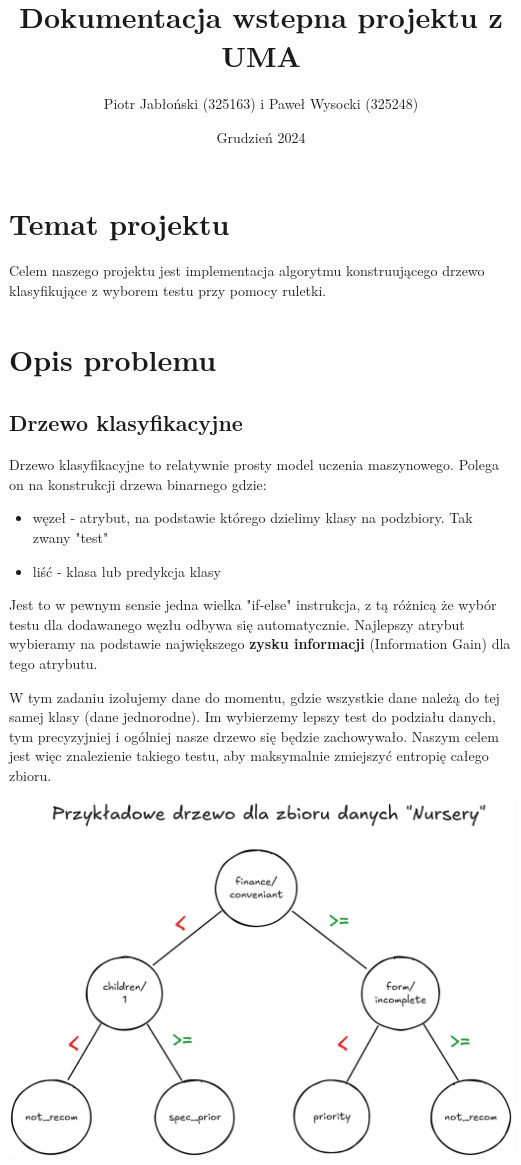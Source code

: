 \documentclass[11pt]{article}
\author{Piotr Jabłoński (325163) i Paweł Wysocki (325248)}
\date{Grudzień 2024}
\title{Dokumentacja wstepna projektu z UMA}
\begin{document}
\maketitle
\tableofcontents

\pagebreak
\section{Temat projektu}
\label{sec:org004bb5c}
Celem naszego projektu jest implementacja algorytmu konstruującego drzewo klasyfikujące z wyborem testu przy pomocy ruletki.
\section{Opis problemu}
\label{sec:org19cc40d}

\subsection{Drzewo klasyfikacyjne}
\label{sec:orgdbf1c0f}
Drzewo klasyfikacyjne to relatywnie prosty model uczenia maszynowego. Polega on na konstrukcji drzewa binarnego gdzie:
\begin{itemize}
\item węzeł - atrybut, na podstawie którego dzielimy klasy na podzbiory. Tak zwany "test"
\item liść - klasa lub predykcja klasy
\end{itemize}
Jest to w pewnym sensie jedna wielka "if-else" instrukcja, z tą różnicą że wybór testu dla dodawanego węzłu odbywa się automatycznie. Najlepszy atrybut wybieramy na podstawie największego \textbf{zysku informacji} (Information Gain) dla tego atrybutu.

W tym zadaniu izolujemy dane do momentu, gdzie wszystkie dane należą do tej samej klasy (dane jednorodne). Im wybierzemy lepszy test do podziału danych, tym precyzyjniej i ogólniej nasze drzewo się będzie zachowywało. Naszym celem jest więc znalezienie takiego testu, aby maksymalnie zmiejszyć entropię całego zbioru.

\begin{center}
\includegraphics[width=.9\linewidth]{./images/example-nursery-tree.png}
\end{center}
\end{document}
